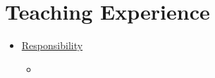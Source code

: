 \section{Teaching Experience}
\begin{itemize}
      \item {}
            {\underline{Responsibility}}{}
            \begin{itemize}
                  \item {}
            \end{itemize}
\end{itemize}